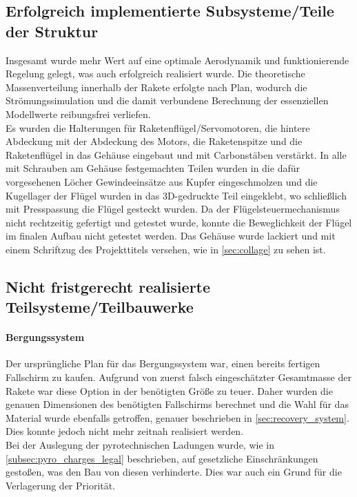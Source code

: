 \subsection{Erfolgreich implementierte Subsysteme/Teile der Struktur}
Insgesamt wurde mehr Wert auf eine optimale Aerodynamik und funktionierende Regelung gelegt, was auch erfolgreich realisiert wurde. Die theoretische Massenverteilung innerhalb der Rakete erfolgte nach Plan, wodurch die Strömungssimulation und die damit verbundene Berechnung der essenziellen Modellwerte reibungsfrei verliefen.
\\
Es wurden die Halterungen für Raketenflügel/Servomotoren, die hintere Abdeckung mit der Abdeckung des Motors, die Raketenspitze und die Raketenflügel in das Gehäuse eingebaut und mit Carbonstäben verstärkt. In alle mit Schrauben am Gehäuse festgemachten Teilen wurden in die dafür vorgesehenen Löcher Gewindeeinsätze aus Kupfer eingeschmolzen und die Kugellager der Flügel wurden in das 3D-gedruckte Teil eingeklebt, wo schließlich mit Presspassung die Flügel gesteckt wurden. Da der Flügelsteuermechanismus nicht rechtzeitig gefertigt und getestet wurde, konnte die Beweglichkeit der Flügel im finalen Aufbau nicht getestet werden. Das Gehäuse wurde lackiert und mit einem Schriftzug des Projekttitels versehen, wie in \ref{sec:collage} zu sehen ist.

\subsection{Nicht fristgerecht realisierte Teilsysteme/Teilbauwerke}
\label{subsec:not_finished_subsystems}
\paragraph{Bergungssystem}
Der ursprüngliche Plan für das Bergungssystem war, einen bereits fertigen Fallschirm zu kaufen. Aufgrund von zuerst falsch eingeschätzter Gesamtmasse der Rakete war diese Option in der benötigten Größe zu teuer. Daher wurden die genauen Dimensionen des benötigten Fallschirms berechnet und die Wahl für das Material wurde ebenfalls getroffen, genauer beschrieben in \ref{sec:recovery_system}. Dies konnte jedoch nicht mehr zeitnah realisiert werden.
\\
Bei der Auslegung der pyrotechnischen Ladungen wurde, wie in \ref{subsec:pyro_charges_legal} beschrieben, auf gesetzliche Einschränkungen gestoßen, was den Bau von diesen verhinderte. Dies war auch ein Grund für die Verlagerung der Priorität.

